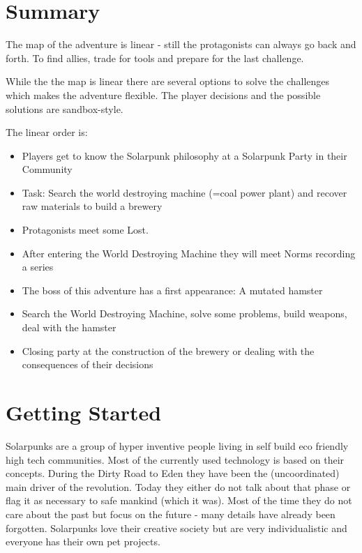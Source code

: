 \section{Summary}

The map of the adventure is linear - still the protagonists can always go back and forth. To find allies, trade for tools and prepare for the last challenge.

While the the map is linear there are several options to solve the challenges which makes the adventure flexible. The player decisions and the possible solutions are sandbox-style.

The linear order is:

\begin{itemize}
\item Players get to know the Solarpunk philosophy at a Solarpunk Party in their Community
\item Task: Search the world destroying machine (=coal power plant) and recover raw materials to build a brewery
\item Protagonists meet some Lost.
\item After entering the World Destroying Machine they will meet Norms recording a series
\item The boss of this adventure has a first appearance: A mutated hamster
\item Search the World Destroying Machine, solve some problems, build weapons, deal with the hamster
\item Closing party at the construction of the brewery or dealing with the consequences of their decisions
\end{itemize}

\section{Getting Started}

\begin{sidebarBox}[title=Solarpunks]
Solarpunks are a group of hyper inventive people living in self build eco friendly high tech communities. Most of the currently used technology is based on their concepts. During the Dirty Road to Eden they have been the (uncoordinated) main driver of the revolution. Today they either do not talk about that phase or flag it as necessary to safe mankind (which it was). Most of the time they do not care about the past but focus on the future - many details have already been forgotten. Solarpunks love their creative society but are very individualistic and everyone has their own pet projects.
\end{sidebarBox}

